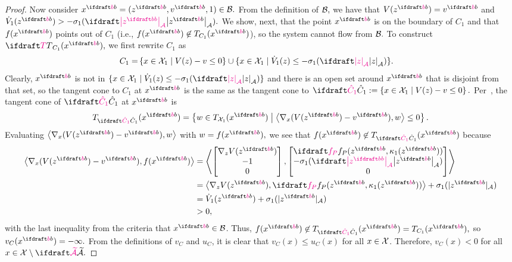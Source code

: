 {\begin{proof}
    \newcommand{\Chat}{\macrocolor{\hat C_1}}
    Now consider $x\ssb = (z\ssb, v\ssb, 1) \in \calB.$ 
    From the definition of ${\mathcal{B}},$ we have that 
    $V(z\ssb) = v\ssb$ and $\dot V_1(z\ssb) > -\sigma_1(\distA{z\ssb}).$
    We show, next, that the point 
    $x\ssb$ is on the boundary of $C_1$ 
    and that $f(x\ssb)$ points out of $C_1$ (i.e., $f(x\ssb) \not\in T_{C_1}(x\ssb) $),
    so the system cannot flow from ${\mathcal{B}}.$ 
    To construct $\tangentcone{C_1}(x\ssb),$ we first rewrite $C_1$ as 
    \begin{align*}
        C_1 =& \setdef{x \in \calX_1 \suchthat V(z) - v \leq 0} 
            \union \{x \in \calX_1 \mid \dot V_1(z) \leq -\sigma_1(\distA{z})\}.
    \end{align*}
    Clearly, $x\ssb$ is not in $\{x \in \calX_1 \mid \dot V_1(z) \leq -\sigma_1(\distA{z})\}$
    and there is an open set around $x\ssb$ that is disjoint from that set, 
    so the tangent cone 
    to $C_1$ at $x\ssb$ is the same as the tangent cone to 
    $\Chat := \setdef{x \in \calX_1 \suchthat V(z) - v \leq 0}.$
    Per~\cite[Proposition 4.3.7]{aubin_tangent_2009},
    the tangent cone of $\Chat$ at $x\ssb$ is
    $$T_\Chat(x\ssb) = \setdef{w \in T_{\calX_1}(x\ssb) 
            \suchthat \ip{\nabla_x(V(z\ssb) - v\ssb)}{w} \leq 0}.$$
    Evaluating $\ip{\nabla_x(V(z\ssb) - v\ssb)}{w}$ 
    with $w = f(x\ssb),$ we see that $f(x\ssb) \not\in T_{\Chat}(x\ssb)$ because
    \begin{align*}
        \ip{\nabla_x(V(z\ssb) - v\ssb)}{f(x\ssb)} 
        &= \ip{\mat{\nabla_z V(z\ssb) \\ - 1 \\ 0}}
            {\mat{\fp(z\ssb, \kappa_1(z\ssb)) \\ -\sigma_1(\distA{z\ssb}) \\ 0}} \\ 
        &= \ip{\nabla_z V(z\ssb)}{\fp(z\ssb, \kappa_1(z\ssb))} + \sigma_1(|z\ssb|_\calA) \\ 
        &= \dot V_1(z\ssb) + \sigma_1(|z\ssb|_\calA) \\ 
        &> 0,
    \end{align*}
    with the last inequality from the criteria that $x\ssb \in \calB$. 
    Thus, $f(x\ssb) \not\in T_\Chat(x\ssb) = T_{C_1}(x\ssb),$ so 
    $v_C(x\ssb) = -\infty.$ 
    From the definitions of $v_C$ and $u_C$, it is clear
    that $v_C(x) \leq u_C(x)$ for all $x \in {\mathcal{X}}$. 
    Therefore, $v_C(x) < 0$ for all $x \in \calX \setminus \calAX.$
\end{proof} 
}

